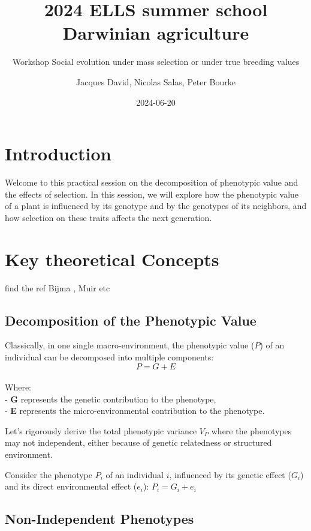 \documentclass[
]{article}
\title{2024 ELLS summer school Darwinian agriculture}
\subtitle{Workshop Social evolution under mass selection or under true
breeding values}
\author{Jacques David, Nicolas Salas, Peter Bourke}
\date{2024-06-20}
\begin{document}
\maketitle

\section{Introduction}\label{introduction}

Welcome to this practical session on the decomposition of phenotypic
value and the effects of selection. In this session, we will explore how
the phenotypic value of a plant is influenced by its genotype and by the
genotypes of its neighbors, and how selection on these traits affects
the next generation.

\section{Key theoretical Concepts}\label{key-theoretical-concepts}

find the ref Bijma , Muir etc

\subsection{Decomposition of the Phenotypic
Value}\label{decomposition-of-the-phenotypic-value}

Classically, in one single macro-environment, the phenotypic value
(\(P\)) of an individual can be decomposed into multiple components:
\[ P = G + E \]\\
Where:\\
- \textbf{G} represents the genetic contribution to the phenotype,\\
- \textbf{E} represents the micro-environmental contribution to the
phenotype.

Let's rigorously derive the total phenotypic variance \(V_P\) where the
phenotypes may not independent, either because of genetic relatedness or
structured environment.

Consider the phenotype \(P_i\) of an individual \(i\), influenced by its
genetic effect (\(G_i\)) and its direct environmental effect (\(e_i\)):
\(P_i = G_i + e_i\)

\subsection{Non-Independent
Phenotypes}\label{non-independent-phenotypes}
\end{document}
